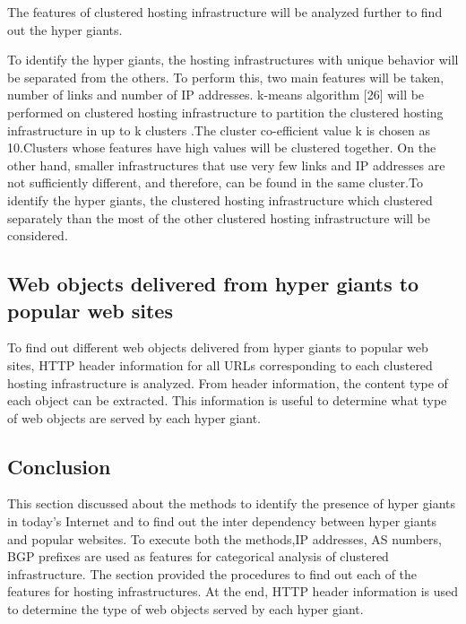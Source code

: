 The features of clustered hosting infrastructure will be analyzed further to find out the hyper giants.

To identify the hyper giants, the hosting infrastructures with unique behavior will be separated from the others. To perform this, two main features will be taken, number of links and number of IP addresses. k-means algorithm [26] will be performed on clustered hosting infrastructure to partition the clustered hosting infrastructure in up to k clusters .The cluster co-efficient value k is chosen as 10.Clusters whose features have high values will be clustered together. On the other hand, smaller infrastructures that use very few links and IP addresses are
not sufficiently different, and therefore, can be found in the same cluster.To identify the hyper giants, the clustered hosting infrastructure which clustered separately than the most of the other clustered hosting infrastructure will be considered.

\subsection{Web objects delivered from hyper giants to popular web sites}
To find out different web objects delivered from hyper giants to popular web sites, HTTP header information for all URLs corresponding to each clustered hosting infrastructure is analyzed. From header information, the content type of each object can be extracted. This information is useful to determine what type of web objects are served by each hyper giant.
\subsection{Conclusion}
This section discussed about the methods to identify the presence of hyper giants in today's Internet and to find out the inter dependency between hyper giants and popular websites. To execute both the methods,IP addresses, AS numbers, BGP prefixes are used as features for categorical analysis of clustered infrastructure. The section provided the procedures to find out each of the features for hosting infrastructures. At the end, HTTP header information is used to determine the type of web objects served by each hyper giant.